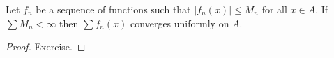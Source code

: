 \documentclass[a4paper]{article}
\begin{document}
\begin{proposition}
  Let \(f_n\) be a sequence of functions such that \(|f_n(x)| \leq M_n\) for all \(x \in A\). If \(\sum M_n < \infty\) then \(\sum f_n(x)\) converges uniformly on \(A\).
\end{proposition}

\begin{proof}
  Exercise.
\end{proof}



\printindex

\iffalse
past lecture notes:
T. Scholl, K. Carne

Book
Ahlfors, Complex Analysis
\fi
\end{document}
